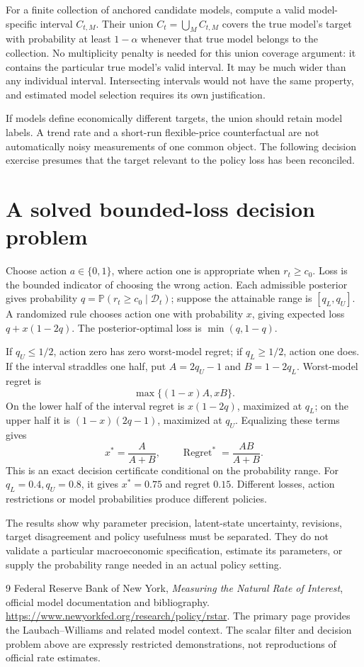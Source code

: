 \documentclass[11pt,a4paper]{article}
\newcommand{\Prb}{\mathbb P}
\begin{document}
For a finite collection of anchored candidate models, compute a valid model-specific interval $C_{t,M}$. Their union $C_t=\bigcup_M C_{t,M}$ covers the true model's target with probability at least $1-\alpha$ whenever that true model belongs to the collection. No multiplicity penalty is needed for this union coverage argument: it contains the particular true model's valid interval. It may be much wider than any individual interval. Intersecting intervals would not have the same property, and estimated model selection requires its own justification.

If models define economically different targets, the union should retain model labels. A trend rate and a short-run flexible-price counterfactual are not automatically noisy measurements of one common object. The following decision exercise presumes that the target relevant to the policy loss has been reconciled.

\section{A solved bounded-loss decision problem}
Choose action $a\in\{0,1\}$, where action one is appropriate when $r_t\ge c_0$. Loss is the bounded indicator of choosing the wrong action. Each admissible posterior gives probability $q=\Prb(r_t\ge c_0\mid\mathcal D_t)$; suppose the attainable range is $[q_L,q_U]$. A randomized rule chooses action one with probability $x$, giving expected loss $q+x(1-2q)$. The posterior-optimal loss is $\min(q,1-q)$.

If $q_U\le1/2$, action zero has zero worst-model regret; if $q_L\ge1/2$, action one does. If the interval straddles one half, put $A=2q_U-1$ and $B=1-2q_L$. Worst-model regret is
\[
 \max\{(1-x)A,xB\}.
\]
On the lower half of the interval regret is $x(1-2q)$, maximized at $q_L$; on the upper half it is $(1-x)(2q-1)$, maximized at $q_U$. Equalizing these terms gives
\[
 x^*=\frac{A}{A+B},\qquad \operatorname{Regret}^*=\frac{AB}{A+B}. \tag{4}
\]
This is an exact decision certificate conditional on the probability range. For $q_L=0.4,q_U=0.8$, it gives $x^*=0.75$ and regret $0.15$. Different losses, action restrictions or model probabilities produce different policies.

The results show why parameter precision, latent-state uncertainty, revisions, target disagreement and policy usefulness must be separated. They do not validate a particular macroeconomic specification, estimate its parameters, or supply the probability range needed in an actual policy setting.

\begin{thebibliography}{9}
 Federal Reserve Bank of New York, \emph{Measuring the Natural Rate of Interest}, official model documentation and bibliography. \url{https://www.newyorkfed.org/research/policy/rstar}. The primary page provides the Laubach--Williams and related model context. The scalar filter and decision problem above are expressly restricted demonstrations, not reproductions of official rate estimates.
\end{thebibliography}
\end{document}
